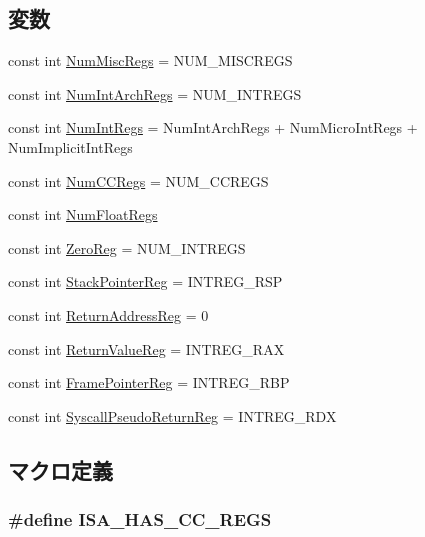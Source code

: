 \subsection*{変数}
\begin{DoxyCompactItemize}
\item 
const int \hyperlink{namespaceX86ISA_a568d4aa96dd7cd963f3b1b1b0446c9c6}{NumMiscRegs} = NUM\_\-MISCREGS
\item 
const int \hyperlink{namespaceX86ISA_a405c0abe85dc0da846c120e3b31f375c}{NumIntArchRegs} = NUM\_\-INTREGS
\item 
const int \hyperlink{namespaceX86ISA_a9c412b5118ce369570c156c4e156638a}{NumIntRegs} = NumIntArchRegs + NumMicroIntRegs + NumImplicitIntRegs
\item 
const int \hyperlink{namespaceX86ISA_a717317b863009b3e1b683c3bdddb9fd3}{NumCCRegs} = NUM\_\-CCREGS
\item 
const int \hyperlink{namespaceX86ISA_a627b25288f2452be107872a138df8b85}{NumFloatRegs}
\item 
const int \hyperlink{namespaceX86ISA_a33dbba4a12f6733a5ecc2d2b3542b7ee}{ZeroReg} = NUM\_\-INTREGS
\item 
const int \hyperlink{namespaceX86ISA_a95d0846360ad0e64cb42fda7268a6434}{StackPointerReg} = INTREG\_\-RSP
\item 
const int \hyperlink{namespaceX86ISA_a99ba4a35fbf9debeb1f7ddb1db7b9967}{ReturnAddressReg} = 0
\item 
const int \hyperlink{namespaceX86ISA_a472eedbcba9726645062b921f8d07e98}{ReturnValueReg} = INTREG\_\-RAX
\item 
const int \hyperlink{namespaceX86ISA_aabd6fa5889c9ccc124dfd4a984046f6f}{FramePointerReg} = INTREG\_\-RBP
\item 
const int \hyperlink{namespaceX86ISA_ab566b6da98edbb32e80291edaf0906ba}{SyscallPseudoReturnReg} = INTREG\_\-RDX
\end{DoxyCompactItemize}


\subsection{マクロ定義}
\hypertarget{x86_2registers_8hh_a15bbbb5d491837c952e0b0a3a2317315}{
\subsubsection[{ISA\_\-HAS\_\-CC\_\-REGS}]{\setlength{\rightskip}{0pt plus 5cm}\#define ISA\_\-HAS\_\-CC\_\-REGS}}
\label{x86_2registers_8hh_a15bbbb5d491837c952e0b0a3a2317315}
